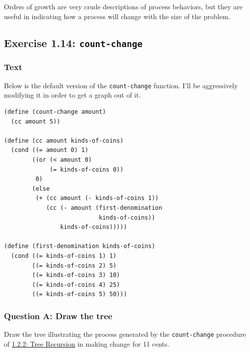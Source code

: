 \documentclass[final,fleqn,titlepage,twoside]{article}
\begin{document}
Orders of growth are very crude descriptions of process behaviors, but they are
useful in indicating how a process will change with the size of the problem.

\subsection{Exercise 1.14: \texttt{count-change}}
\label{sec:org0a051b9}
\subsubsection{Text}
\label{sec:org6b29646}
Below is the default version of the \texttt{count-change} function. I'll be
aggressively modifying it in order to get a graph out of it.
\begin{verbatim}
(define (count-change amount)
  (cc amount 5))

(define (cc amount kinds-of-coins)
  (cond ((= amount 0) 1)
        ((or (< amount 0)
             (= kinds-of-coins 0))
         0)
        (else
         (+ (cc amount (- kinds-of-coins 1))
            (cc (- amount (first-denomination
                           kinds-of-coins))
                kinds-of-coins)))))

(define (first-denomination kinds-of-coins)
  (cond ((= kinds-of-coins 1) 1)
        ((= kinds-of-coins 2) 5)
        ((= kinds-of-coins 3) 10)
        ((= kinds-of-coins 4) 25)
        ((= kinds-of-coins 5) 50)))
\end{verbatim}

\subsubsection{Question A: Draw the tree}
\label{sec:org21c42cc}
Draw the tree illustrating the process generated by the \texttt{count-change}
procedure of \hyperref[sec:org14a9342]{1.2.2: Tree Recursion} in making change for 11 cents.
\end{document}
